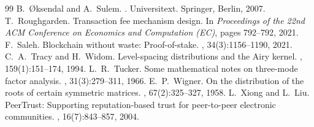 \documentclass[11pt,a4paper]{article}
\numberwithin{equation}{section}
\numberwithin{table}{section}
\begin{document}
\begin{thebibliography}{99}
 B.~{\O}ksendal and A.~Sulem. . \newblock Universitext. Springer, Berlin, 2007.
 T.~Roughgarden. \newblock Transaction fee mechanism design. \newblock In {\em Proceedings of the 22nd ACM Conference on Economics and Computation (EC)}, pages 792--792, 2021.
 F.~Saleh. \newblock Blockchain without waste: Proof-of-stake. , 34(3):1156--1190, 2021.
 C.~A.~Tracy and H.~Widom. \newblock Level-spacing distributions and the Airy kernel. , 159(1):151--174, 1994.
 L.~R.~Tucker. \newblock Some mathematical notes on three-mode factor analysis. , 31(3):279--311, 1966.
 E.~P.~Wigner. \newblock On the distribution of the roots of certain symmetric matrices. , 67(2):325--327, 1958.
 L.~Xiong and L.~Liu. \newblock PeerTrust: Supporting reputation-based trust for peer-to-peer electronic communities. , 16(7):843--857, 2004.
\end{thebibliography}
\end{document}
